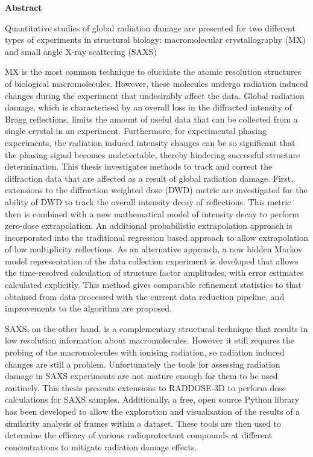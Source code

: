 \newenvironment{abstract}%
{\clearpage\thispagestyle{empty}\vfill\begin{center}%
\bfseries Abstract\end{center}}%
{\vfill}
\begin{abstract}
\small
\singlespacing
Quantitative studies of global radiation damage are presented for two different types of experiments in structural biology: macromolecular crystallography (MX) and small angle X-ray scattering (SAXS)

MX is the most common technique to elucidate the atomic resolution structures of biological macromolecules.
However, these molecules undergo radiation induced changes during the experiment that undesirably affect the data.
Global radiation damage, which is characterised by an overall loss in the diffracted intensity of Bragg reflections, limits the amount of useful data that can be collected from a single crystal in an experiment.
Furthermore, for experimental phasing experiments, the radiation induced intensity changes can be so significant that the phasing signal becomes undetectable, thereby hindering successful structure determination.
This thesis investigates methods to track and correct the diffraction data that are affected as a result of global radiation damage.
First, extensions to the diffraction weighted dose (DWD) metric are investigated for the ability of DWD to track the overall intensity decay of reflections.
This metric then is combined with a new mathematical model of intensity decay to perform zero-dose extrapolation.
An additional probabilistic extrapolation approach is incorporated into the traditional regression based approach to allow extrapolation of low multiplicity reflections.
As an alternative approach, a new hidden Markov model representation of the data collection experiment is developed that allows the time-resolved calculation of structure factor amplitudes, with error estimates calculated explicitly.
This method gives comparable refinement statistics to that obtained from data processed with the current data reduction pipeline, and improvements to the algorithm are proposed.

SAXS, on the other hand, is a complementary structural technique that results in low resolution information about macromolecules.
However it still requires the probing of the macromolecules with ionising radiation, so radiation induced changes are still a problem.
Unfortunately the tools for assessing radiation damage in SAXS experiments are not mature enough for them to be used routinely.
This thesis presents extensions to RADDOSE-3D to perform dose calculations for SAXS samples.
Additionally, a free, open source Python library has been developed to allow the exploration and visualisation of the results of a similarity analysis of frames within a dataset.
These tools are then used to determine the efficacy of various radioprotectant compounds at different concentrations to mitigate radiation damage effects.
\end{abstract}
